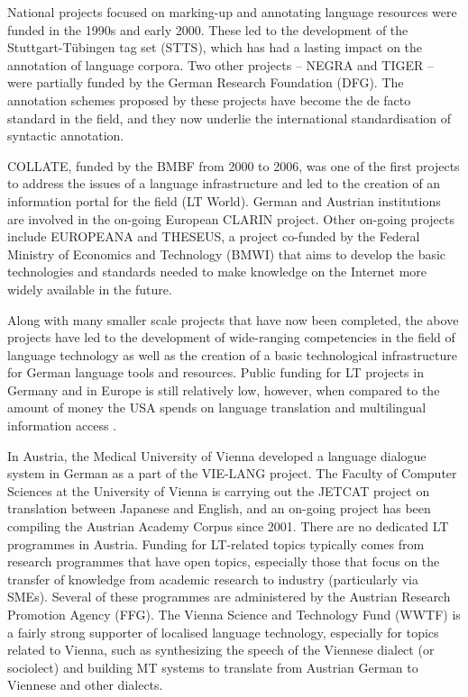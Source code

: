 \documentclass[]{../../metanetpaper}
\begin{document}
\begin{multicols}{2}
    National projects focused on marking-up and annotating language resources were funded in the 1990s and early 2000. These led to the development of the Stuttgart-Tübingen tag set (STTS), which has had a lasting impact on the annotation of language corpora. Two other projects – NEGRA and TIGER – were partially funded by the German Research Foundation (DFG). The annotation schemes proposed by these projects have become the de facto standard in the field, and they now underlie the international standardisation of syntactic annotation.

    COLLATE, funded by the BMBF from 2000 to 2006, was one of the first projects to address the issues of a language infrastructure and led to the creation of an information portal for the field (LT World). German and Austrian institutions are involved in the on-going European CLARIN project. Other on-going projects include EUROPEANA and THESEUS, a project co-funded by the Federal Ministry of Economics and Technology (BMWI) that aims to develop the basic technologies and standards needed to make knowledge on the Internet more widely available in the future. 

    Along with many smaller scale projects that have now been completed, the above projects have led to the development of wide-ranging competencies in the field of language technology as well as the creation of a basic technological infrastructure for German language tools and resources. Public funding for LT projects in Germany and in Europe is still relatively low, however, when compared to the amount of money the USA spends on language translation and multilingual information access \cite{laz1}. 

    In Austria, the Medical University of Vienna developed a language dialogue system in German as a part of the VIE-LANG project. The Faculty of Computer Sciences at the University of Vienna is carrying out the JETCAT project on translation between Japanese and English, and an on-going project has been compiling the Austrian Academy Corpus since 2001. There are no dedicated LT programmes in Austria. Funding for LT-related topics typically comes from research programmes that have open topics, especially those that focus on the transfer of knowledge from academic research to industry (particularly via SMEs). Several of these programmes are administered by the Austrian Research Promotion Agency (FFG). The Vienna Science and Technology Fund (WWTF) is a fairly strong supporter of localised language technology, especially for topics related to Vienna, such as synthesizing the speech of the Viennese dialect (or sociolect) and building MT systems to translate from Austrian German to Viennese and other dialects. 


\end{multicols}
\end{document}
